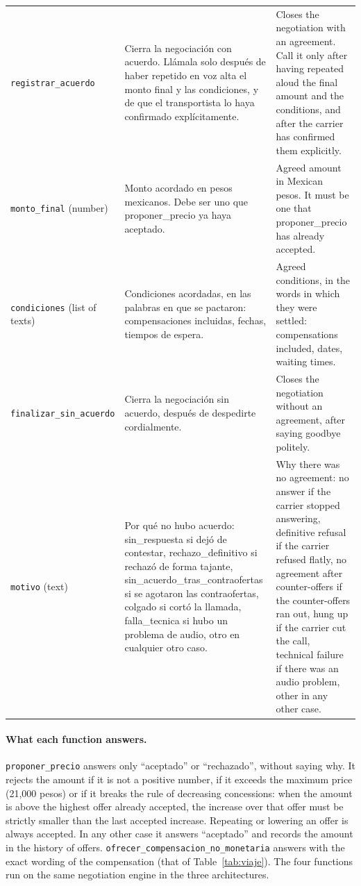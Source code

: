 \documentclass[11pt]{article}
\begin{document}
\begin{table}[H]
\begin{tabularx}{\linewidth}{@{}P{2.7cm}YY@{}}
\texttt{registrar\_\allowbreak acuerdo} & Cierra la negociación con acuerdo. Llámala solo después de haber repetido en voz alta el monto final y las condiciones, y de que el transportista lo haya confirmado explícitamente. & Closes the negotiation with an agreement. Call it only after having repeated aloud the final amount and the conditions, and after the carrier has confirmed them explicitly.\\
\quad\texttt{monto\_final} (number) & Monto acordado en pesos mexicanos. Debe ser uno que proponer\_precio ya haya aceptado. & Agreed amount in Mexican pesos. It must be one that proponer\_precio has already accepted.\\
\quad\texttt{condiciones} (list of texts) & Condiciones acordadas, en las palabras en que se pactaron: compensaciones incluidas, fechas, tiempos de espera. & Agreed conditions, in the words in which they were settled: compensations included, dates, waiting times.\\
\addlinespace
\texttt{finalizar\_\allowbreak sin\_\allowbreak acuerdo} & Cierra la negociación sin acuerdo, después de despedirte cordialmente. & Closes the negotiation without an agreement, after saying goodbye politely.\\
\quad\texttt{motivo} (text) & Por qué no hubo acuerdo: sin\_respuesta si dejó de contestar, rechazo\_definitivo si rechazó de forma tajante, sin\_acuerdo\_tras\_contraofertas si se agotaron las contraofertas, colgado si cortó la llamada, falla\_tecnica si hubo un problema de audio, otro en cualquier otro caso. & Why there was no agreement: no answer if the carrier stopped answering, definitive refusal if the carrier refused flatly, no agreement after counter-offers if the counter-offers ran out, hung up if the carrier cut the call, technical failure if there was an audio problem, other in any other case.\\
\bottomrule
\end{tabularx}
\end{table}

\paragraph{What each function answers.} \texttt{proponer\_precio} answers only
``aceptado'' or ``rechazado'', without saying why. It rejects the amount if it is not
a positive number, if it exceeds the maximum price (21,000 pesos) or if it breaks
the rule of decreasing concessions: when the amount is above the highest offer
already accepted, the increase over that offer must be strictly smaller than the
last accepted increase. Repeating or lowering an offer is always accepted. In any
other case it answers ``aceptado'' and records the amount in the history of offers.
\texttt{ofrecer\_compensacion\_no\_monetaria} answers with the exact wording of the
compensation (that of Table~\ref{tab:viaje}). The four functions run on the same
negotiation engine in the three architectures.
\end{document}
